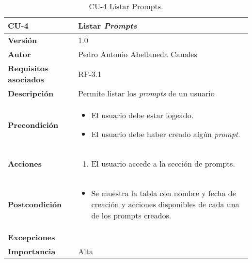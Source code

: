 \begin{table}[p]
	\centering
	\begin{tabularx}{\linewidth}{ p{} p{} }
		\toprule
		\textbf{CU-4}    & \textbf{Listar \textit{Prompts}} \\
		\midrule
		\textbf{Versión}              & 1.0    \\
		\textbf{Autor}                & Pedro Antonio Abellaneda Canales \\
		\textbf{Requisitos asociados} & RF-3.1 \\
		\textbf{Descripción}          & Permite listar los \textit{prompts} de un usuario \\
		\textbf{Precondición}         
                                    & 
                                    \begin{itemize}
                                        \tightlist
                                        \item El usuario debe estar logeado.
                                        \item  El usuario debe haber creado algún \textit{prompt}.
                                    \end{itemize}  
                                    \\
		\textbf{Acciones}             &
		\begin{enumerate}
			\def\labelenumi{\arabic{enumi}.}
			\tightlist
			\item El usuario accede a la sección de prompts.
		\end{enumerate} \\
		\textbf{Postcondición}        
                                & 
                                \begin{itemize} 
                                    \tightlist
                                    \item Se muestra la tabla con nombre y fecha de creación y acciones disponibles de cada una de los prompts creados.
                                \end{itemize}  
                                \\ 
		\textbf{Excepciones}          
        & 
        \\ 
		\textbf{Importancia}          & Alta \\
		\bottomrule
	\end{tabularx}
	\caption{CU-4 Listar Prompts.}
	\label{tab:CU-4}
\end{table}

